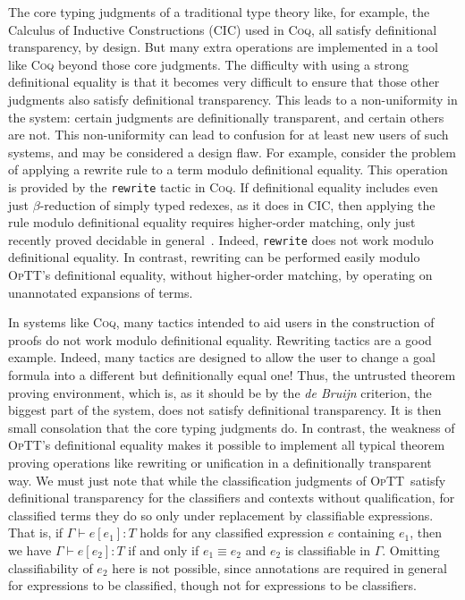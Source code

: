 \documentclass{fundam}
\newcommand{\seq}[3]{#1 \vdash #2 : #3}
\newcommand{\optt}{\textsc{OpTT}}
\begin{document}
The core typing judgments of a traditional type theory like, for
example, the Calculus of Inductive Constructions (CIC) used in
\textsc{Coq}, all satisfy definitional transparency, by design.  But
many extra operations are implemented in a tool like \textsc{Coq}
beyond those core judgments.  The difficulty with using a strong
definitional equality is that it becomes very difficult to ensure that
those other judgments also satisfy definitional transparency.  This
leads to a non-uniformity in the system: certain judgments are
definitionally transparent, and certain others are not.  This
non-uniformity can lead to confusion for at least new users of such
systems, and may be considered a design flaw.  For example, consider
the problem of applying a rewrite rule to a term modulo definitional
equality.  This operation is provided by the \texttt{rewrite} tactic
in \textsc{Coq}.  If definitional equality includes even just
$\beta$-reduction of simply typed redexes, as it does in CIC, then
applying the rule modulo definitional equality requires higher-order
matching, only just recently proved decidable in
general~\cite{stirling06}.  Indeed, \texttt{rewrite} does not work
modulo definitional equality.  In contrast, rewriting can be performed
easily modulo \optt's definitional equality, without higher-order
matching, by operating on unannotated expansions of terms.

In systems like \textsc{Coq}, many tactics intended to aid users in
the construction of proofs do not work modulo definitional equality.
Rewriting tactics are a good example.  Indeed, many tactics are
designed to allow the user to change a goal formula into a different
but definitionally equal one!  Thus, the untrusted theorem proving
environment, which is, as it should be by the \emph{de Bruijn}
criterion, the biggest part of the system, does not satisfy
definitional transparency.  It is then small consolation that the core
typing judgments do.  In contrast, the weakness of \optt's
definitional equality makes it possible to implement all typical
theorem proving operations like rewriting or unification in a
definitionally transparent way.  We must just note that while the
classification judgments of \optt\ satisfy definitional transparency
for the classifiers and contexts without qualification, for classified
terms they do so only under replacement by classifiable expressions.
That is, if $\seq{\Gamma}{e[e_1]}{T}$ holds for any classified
expression $e$ containing $e_1$, then we have
$\seq{\Gamma}{e[e_2]}{T}$ if and only if $e_1 \equiv e_2$ and $e_2$ is
classifiable in $\Gamma$.  Omitting classifiability of $e_2$ here is
not possible, since annotations are required in general for
expressions to be classified, though not for expressions to be
classifiers.
\end{document}
